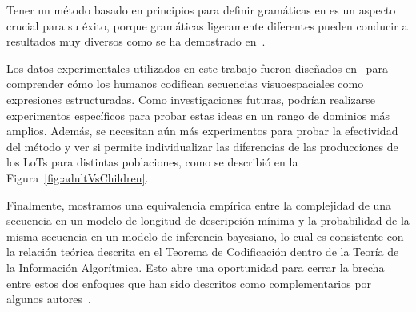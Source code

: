 Tener un método basado en principios para definir gramáticas en \lot es un aspecto crucial para su éxito, porque gramáticas ligeramente diferentes pueden conducir a resultados muy diversos como se ha demostrado en~\cite{piantadosi2016logical}.


Los datos experimentales utilizados en este trabajo fueron diseñados en~\cite{amalric2017language} para comprender cómo los humanos codifican secuencias visuoespaciales como expresiones estructuradas. Como investigaciones futuras, podrían realizarse experimentos específicos para probar estas ideas en un rango de dominios más amplios. Además, se necesitan aún más experimentos para probar la efectividad del método y ver si permite individualizar las diferencias de las producciones de los LoTs para distintas poblaciones, como se describió en la Figura~\ref{fig:adultVsChildren}.


Finalmente, mostramos una equivalencia empírica entre la complejidad de una secuencia en un modelo de longitud de descripción mínima y la probabilidad de la misma secuencia en un modelo de inferencia bayesiano, lo cual es consistente con la relación teórica descrita en el Teorema de Codificación dentro de la Teoría de la Información Algorítmica. Esto abre una oportunidad para cerrar la brecha entre estos dos enfoques que han sido descritos como complementarios por algunos autores~\cite{mackay2003information}.

